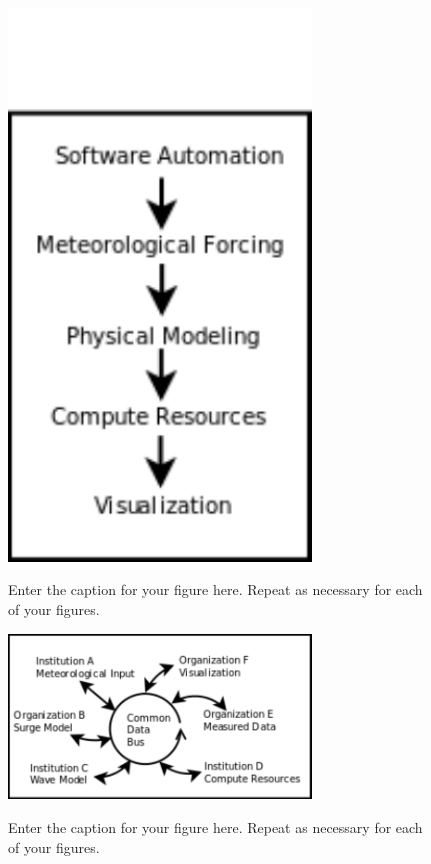 \documentclass[12pt]{article}
\begin{document}
\begin{figure}[t]
  \noindent\includegraphics[width=19pc,angle=0]{closed_system.pdf}\\
  \caption{Enter the caption for your figure here.  Repeat as
  necessary for each of your figures.}\label{f1}
\end{figure}

\begin{figure}[t]
  \noindent\includegraphics[width=19pc,angle=0]{distributed_chain.pdf}\\
  \caption{Enter the caption for your figure here.  Repeat as
  necessary for each of your figures.}\label{f1}
\end{figure}
\end{document}
